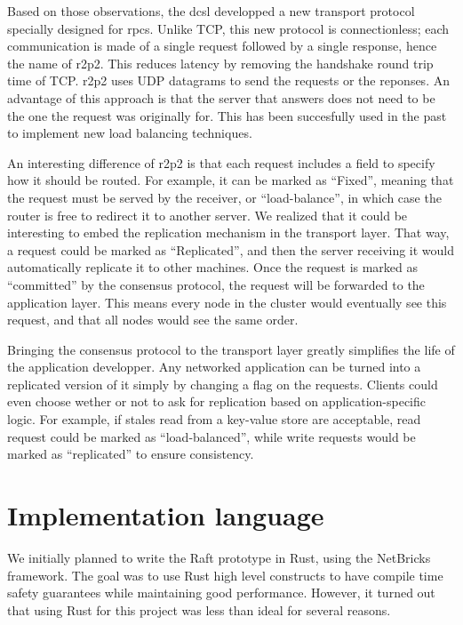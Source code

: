 Based on those observations, the \gls{dcsl} developped a new transport protocol specially designed for \glspl{rpc}.
Unlike TCP, this new protocol is connectionless; each communication is made of a single request followed by a single response, hence the name of \gls{r2p2}.
This reduces latency by removing the handshake round trip time of TCP.
\gls{r2p2} uses UDP datagrams to send the requests or the reponses.
An advantage of this approach is that the server that answers does not need to be the one the request was originally for.
This has been succesfully used in the past to implement new load balancing techniques\cite{r2p2}.

An interesting difference of \gls{r2p2} is that each request includes a field to specify how it should be routed.
For example, it can be marked as ``Fixed'', meaning that the request must be served by the receiver, or ``load-balance'', in which case the router is free to redirect it to another server.
We realized that it could be interesting to embed the replication mechanism in the transport layer.
That way, a request could be marked as ``Replicated'', and then the server receiving it would automatically replicate it to other machines.
Once the request is marked as ``committed'' by the consensus protocol, the request will be forwarded to the application layer.
This means every node in the cluster would eventually see this request, and that all nodes would see the same order.

Bringing the consensus protocol to the transport layer greatly simplifies the life of the application developper.
Any networked application can be turned into a replicated version of it simply by changing a flag on the requests.
Clients could even choose wether or not to ask for replication based on application-specific logic.
For example, if stales read from a key-value store are acceptable, read request could be marked as ``load-balanced'', while write requests would be marked as ``replicated'' to ensure consistency.

\section{Implementation language}

We initially planned to write the Raft prototype in Rust, using the NetBricks\cite{netbricks} framework.
The goal was to use Rust high level constructs to have compile time safety guarantees while maintaining good performance.
However, it turned out that using Rust for this project was less than ideal for several reasons.

